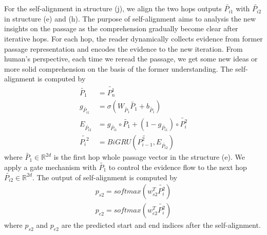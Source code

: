 \documentclass[letterpaper]{article} %
\begin{document}
For the self-alignment in structure (j), we align the two hops outputs $\widetilde{P_{i1}}$ with $\widetilde{P_{i2}}$ in structure (e) and (h). The purpose of self-alignment aims to analysis the new insights on the passage as the comprehension gradually become clear after iterative hops. For each hop, the reader dynamically collects evidence from former passage representation and encodes the evidence to the new iteration. From human's perspective, each time we reread the passage, we get some new ideas or more solid comprehension on the basis of the former understanding. The self-alignment is computed by
\begin{align*}
\widetilde{P_{1}}&= \widetilde{P_{n}^1} \\
g_{\widetilde{P_{i1}}}&=\sigma(W_{\widetilde{P_{1}}}\widetilde{P_{1}}+b_{\widetilde{P_{1}}})\\
E_{\widetilde{P_{i2}}}&=g_{\widetilde{P_{i1}}}\circ  \widetilde{P_{1}}+(1-g_{\widetilde{P_{i1}}})\circ \widetilde{P_i^2}\\
\widetilde{{P_i}^2}&=BiGRU(\widetilde{P_{i-1}^2},E_{\widetilde{P_{i2}}}) \tag{9}
\end{align*} 
where $\widetilde{P_{1}}\in \mathbb{R}^{2d}$ is the first hop whole passage vector in the structure (e). We apply a gate mechanism with $\widetilde{P_{1}}$ to control the evidence flow to the next hop $\widetilde{P_{i2}} \in \mathbb{R}^{2d}$. The output of self-alignment is computed by
\begin{align*}
p_{s2}=softmax(w^T_{s2}\widetilde{P_i^2})\\
p_{e2}=softmax(w^T_{e2}\widetilde{P_i^2}) \tag{10}
\end{align*}
 where $p_{s2}$ and $p_{e2}$ are the predicted start and end indices after the self-alignment.
 
\end{document}
